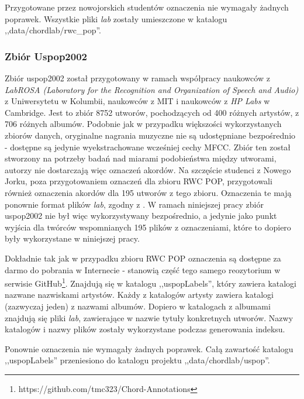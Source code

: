 Przygotowane przez nowojorskich studentów oznaczenia nie wymagały żadnych poprawek. Wszystkie pliki
\emph{lab} zostały umieszczone w katalogu ,,data/chordlab/rwc\_pop''.

\subsubsection{Zbiór Uspop2002}

Zbiór uspop2002 \cite{berenzweig_large-scale_2004} został przygotowany w ramach współpracy naukowców
z \emph{LabROSA (Laboratory for the Recognition and Organization of Speech and Audio)} z
Uniwersytetu w Kolumbii, naukowców z MIT i naukowców z \emph{HP Labs} w Cambridge. Jest to zbiór
8752 utworów, pochodzących od 400 różnych artystów, z 706 różnych albumów. Podobnie jak w przypadku
większości wykorzystanych zbiorów danych, oryginalne nagrania muzyczne nie są udostępniane
bezpośrednio - dostępne są jedynie wyekstrachowane wcześniej cechy MFCC. Zbiór ten został stworzony
na potrzeby badań nad miarami podobieństwa między utworami, autorzy nie dostarczają więc oznaczeń
akordów. Na szczęście studenci z Nowego Jorku, poza przygotowaniem oznaczeń dla zbioru RWC POP,
przygotowali również oznaczenia akordów dla 195 utworów z tego zbioru. Oznaczenia te mają ponownie
format plików \emph{lab}, zgodny z \cite{harte_towards_nodate}. W ramach niniejszej pracy zbiór
uspop2002 nie był więc wykorzystywany bezpośrednio, a jedynie jako punkt wyjścia dla twórców
wspomnianych 195 plików z oznaczeniami, które to dopiero były wykorzystane w niniejszej pracy.

Dokładnie tak jak w przypadku zbioru RWC POP oznaczenia są dostępne za darmo do pobrania w
Internecie - stanowią część tego samego reozytorium w serwisie
GitHub\footnote{https://github.com/tmc323/Chord-Annotations}. Znajdują się w katalogu
,,uspopLabels'', który zawiera katalogi nazwane nazwiskami artystów. Każdy z katalogów artysty
zawiera katalogi (zazwyczaj jeden) z nazwami albumów. Dopiero w katalogach z albumami znajdują się
pliki \emph{lab}, zawierające w nazwie tytuły konkretnych utworów. Nazwy katalogów i nazwy plików
zostały wykorzystane podczas generowania indeksu.

Ponownie oznaczenia nie wymagały żadnych poprawek. Całą zawartość katalogu ,,uspopLabels''
przeniesiono do katalogu projektu ,,data/chordlab/uspop''.

